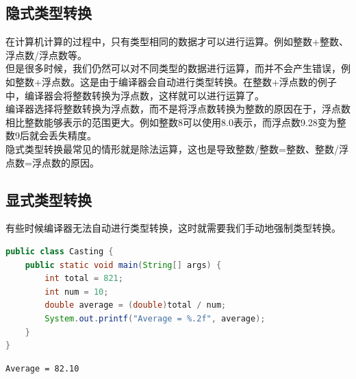 \vspace{0.5cm}

\subsection{隐式类型转换}

在计算机计算的过程中，只有类型相同的数据才可以进行运算。例如整数+整数、浮点数/浮点数等。\\

但是很多时候，我们仍然可以对不同类型的数据进行运算，而并不会产生错误，例如整数+浮点数。这是由于编译器会自动进行类型转换。在整数+浮点数的例子中，编译器会将整数转换为浮点数，这样就可以进行运算了。\\

编译器选择将整数转换为浮点数，而不是将浮点数转换为整数的原因在于，浮点数相比整数能够表示的范围更大。例如整数8可以使用8.0表示，而浮点数9.28变为整数9后就会丢失精度。\\

隐式类型转换最常见的情形就是除法运算，这也是导致整数/整数=整数、整数/浮点数=浮点数的原因。\\

\subsection{显式类型转换}

有些时候编译器无法自动进行类型转换，这时就需要我们手动地强制类型转换。\\


\begin{lstlisting}[language=Java]
public class Casting {
	public static void main(String[] args) {
		int total = 821;
		int num = 10;
		double average = (double)total / num;
		System.out.printf("Average = %.2f", average);
	}
}
\end{lstlisting}

\begin{tcolorbox}
	\begin{verbatim}
Average = 82.10
	\end{verbatim}
\end{tcolorbox}

\newpage
